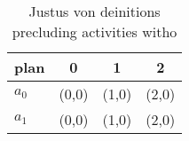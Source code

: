 \documentclass[a4paper]{article}
\begin{document}
\begin{table}
\begin{adjustbox}{width=0.5\columnwidth}
\begin{tabular}{|l|l|l|l|}
\hline
\textbf{plan} & \multicolumn{1}{c|}{\textbf{0}} & \multicolumn{1}{c|}{\textbf{1}} & \multicolumn{1}{c|}{\textbf{2}} \\ \hline
\textbf{$a_0$}  & (0,0) & (1,0) & (2,0) \\ \hline
\textbf{$a_1$}  & (0,0) & (1,0) & (2,0) \\ \hline
\end{tabular}
\end{adjustbox}
\caption{Justus von deinitions precluding activities witho
}
\end{table}
\end{document}
